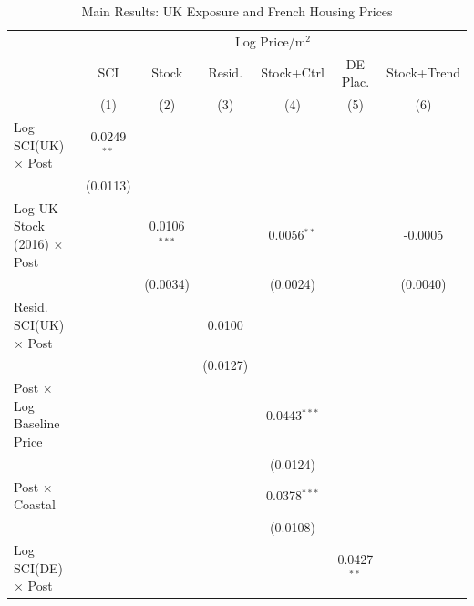 
\begin{table}[htbp]
   \caption{\label{tab:main} Main Results: UK Exposure and French Housing Prices}
   \bigskip
   \centering
   \begin{tabular}{lcccccc}
      \toprule
       & \multicolumn{6}{c}{Log Price/m$^2$}\\
                                             & SCI           & Stock          & Resid.        & Stock+Ctrl     & DE Plac.      & Stock+Trend \\   
                                             & (1)           & (2)            & (3)           & (4)            & (5)           & (6)\\  
      \midrule 
      Log SCI(UK) $\times$ Post              & 0.0249$^{**}$ &                &               &                &               &   \\   
                                             & (0.0113)      &                &               &                &               &   \\   
      Log UK Stock (2016) $\times$ Post      &               & 0.0106$^{***}$ &               & 0.0056$^{**}$  &               & -0.0005\\   
                                             &               & (0.0034)       &               & (0.0024)       &               & (0.0040)\\   
      Resid. SCI(UK) $\times$ Post           &               &                & 0.0100        &                &               &   \\   
                                             &               &                & (0.0127)      &                &               &   \\   
      Post $\times$ Log Baseline Price       &               &                &               & 0.0443$^{***}$ &               &   \\   
                                             &               &                &               & (0.0124)       &               &   \\   
      Post $\times$ Coastal                  &               &                &               & 0.0378$^{***}$ &               &   \\   
                                             &               &                &               & (0.0108)       &               &   \\   
      Log SCI(DE) $\times$ Post              &               &                &               &                & 0.0427$^{**}$ &   \\   

\end{tabular}
\end{table}

